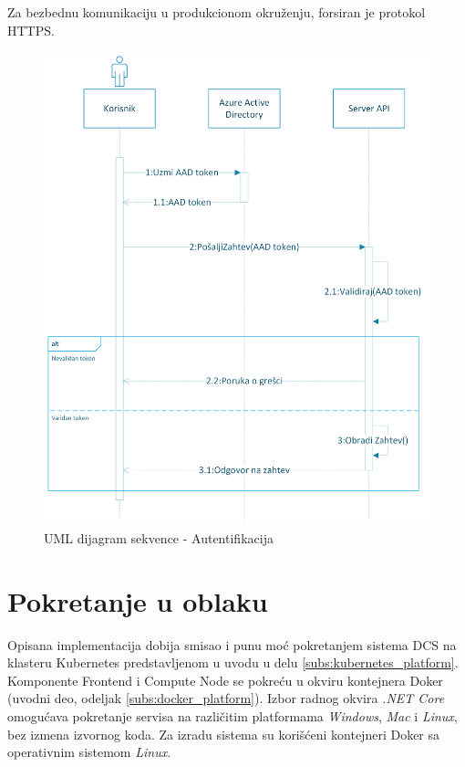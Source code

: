 \documentclass[12pt,oneside]{memoir}
\begin{document}
Za bezbednu komunikaciju u produkcionom okruženju, forsiran je protokol HTTPS.

\begin{figure}[!ht]
  \centering
  \includegraphics[width=1.0\textwidth]{./images/autentikacija_uml_dijagram_sekvence.png}
  \caption{UML dijagram sekvence - Autentifikacija}
  \label{fig:autentifikacija}
\end{figure}


\section{Pokretanje u oblaku}

Opisana implementacija dobija smisao i punu moć pokretanjem sistema DCS na klasteru Kubernetes predstavljenom u uvodu u delu \ref{subs:kubernetes_platform}. Komponente Frontend i Compute Node se pokreću u okviru kontejnera Doker (uvodni deo, odeljak \ref{subs:docker_platform}). Izbor radnog okvira \emph{.NET Core} omogućava pokretanje servisa na različitim platformama \emph{Windows}, \emph{Mac} i \emph{Linux}, bez izmena izvornog koda. Za izradu sistema su korišćeni kontejneri Doker sa operativnim sistemom \emph{Linux}.
\end{document}
